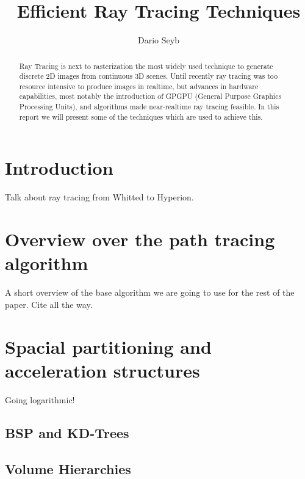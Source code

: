 \documentclass{ACGSeminar}
\begin{document}
\title{Efficient Ray Tracing Techniques}

\author{Dario Seyb}

\maketitle


\begin{abstract}%
Ray Tracing is next to rasterization the most widely used technique to generate discrete 2D images from continuous 3D scenes. Until recently ray tracing was too resource intensive to produce images in realtime, but advances in hardware capabilities, most notably the introduction of GPGPU (General Purpose Graphics Processing Units), and algorithms made near-realtime ray tracing feasible. In this report we will present some of the techniques which are used to achieve this.
\end{abstract}

\tableofcontents


\section{Introduction}

Talk about ray tracing from Whitted to Hyperion. 

\section{Overview over the path tracing algorithm}
A short overview of the base algorithm we are going to use for the rest of the paper. Cite \cite{veach1997robust} all the way.

\section{Spacial partitioning and acceleration structures}
Going logarithmic!
\subsection{BSP and KD-Trees}
\subsection{Volume Hierarchies}
\end{document}
